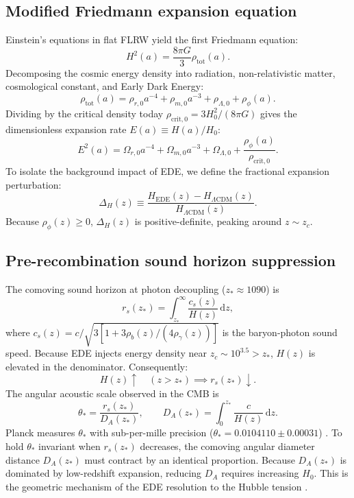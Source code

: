 \documentclass[11pt]{article}
\newcommand{\dd}{\,\mathrm d}
\newcommand{\LCDM}{\Lambda\mathrm{CDM}}
\newcommand{\zc}{z_c}
\begin{document}
\subsection{Modified Friedmann expansion equation}
Einstein's equations in flat FLRW yield the first Friedmann equation:
\begin{equation}
H^2(a) = \frac{8\pi G}{3}\rho_{\mathrm{tot}}(a).
\end{equation}
Decomposing the cosmic energy density into radiation, non-relativistic matter, cosmological constant, and Early Dark Energy:
\begin{equation}
\rho_{\mathrm{tot}}(a) = \rho_{r,0}a^{-4} + \rho_{m,0}a^{-3} + \rho_{\Lambda,0} + \rho_\phi(a).
\end{equation}
Dividing by the critical density today $\rho_{\mathrm{crit},0} = 3H_0^2 / (8\pi G)$ gives the dimensionless expansion rate $E(a) \equiv H(a) / H_0$:
\begin{equation}
\boxed{E^2(a) = \Omega_{r,0}a^{-4} + \Omega_{m,0}a^{-3} + \Omega_{\Lambda,0} + \frac{\rho_\phi(a)}{\rho_{\mathrm{crit},0}}}.
\label{eq:friedmann_ede}
\end{equation}
To isolate the background impact of EDE, we define the fractional expansion perturbation:
\begin{equation}
\boxed{\Delta_H(z) \equiv \frac{H_{\mathrm{EDE}}(z) - H_{\LCDM}(z)}{H_{\LCDM}(z)}}.
\end{equation}
Because $\rho_\phi(z) \ge 0$, $\Delta_H(z)$ is positive-definite, peaking around $z \sim \zc$.

\subsection{Pre-recombination sound horizon suppression}
The comoving sound horizon at photon decoupling ($z_* \approx 1090$) is
\begin{equation}
r_s(z_*) = \int_{z_*}^\infty \frac{c_s(z)}{H(z)}\dd z,
\end{equation}
where $c_s(z) = c / \sqrt{3[1 + 3\rho_b(z)/(4\rho_\gamma(z))]}$ is the baryon-photon sound speed. Because EDE injects energy density near $\zc \sim 10^{3.5} > z_*$, $H(z)$ is elevated in the denominator. Consequently:
\begin{equation}
H(z) \uparrow \quad (z > z_*) \implies \boxed{r_s(z_*) \downarrow}.
\end{equation}
The angular acoustic scale observed in the CMB is
\begin{equation}
\theta_* = \frac{r_s(z_*)}{D_A(z_*)}, \qquad D_A(z_*) = \int_0^{z_*} \frac{c}{H(z)}\dd z.
\end{equation}
Planck measures $\theta_*$ with sub-per-mille precision ($\theta_* = 0.0104110 \pm 0.00031$) \cite{planck2020params}. To hold $\theta_*$ invariant when $r_s(z_*)$ decreases, the comoving angular diameter distance $D_A(z_*)$ must contract by an identical proportion. Because $D_A(z_*)$ is dominated by low-redshift expansion, reducing $D_A$ requires increasing $H_0$. This is the geometric mechanism of the EDE resolution to the Hubble tension \cite{karwal2016ede,poulin2019ede}.
\end{document}
